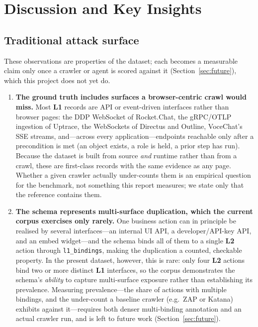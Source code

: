 \documentclass[11pt,a4paper]{article}
\newcommand{\cd}[1]{\lstinline[basicstyle=\ttfamily\small]|#1|}
\renewcommand{\L}[1]{\textbf{L#1}}
\begin{document}
\section{Discussion and Key Insights}\label{sec:disc}

\subsection{Traditional attack surface}
These observations are properties of the dataset; each becomes a measurable claim only once
a crawler or agent is scored against it (Section~\ref{sec:future}), which this project does
not yet do.
\begin{enumerate}[leftmargin=1.6em,itemsep=3pt]
\item \textbf{The ground truth includes surfaces a browser-centric crawl would miss.}
      Most \L1 records are API or event-driven interfaces rather than browser pages: the
      DDP WebSocket of Rocket.Chat, the gRPC/OTLP ingestion of Uptrace, the WebSockets of
      Directus and Outline, VoceChat's SSE streams, and---across every application---endpoints
      reachable only after a precondition is met (an object exists, a role is held, a prior
      step has run). Because the dataset is built from source \emph{and} runtime rather than
      from a crawl, these are first-class records with the same evidence as any page. Whether
      a given crawler actually under-counts them is an empirical question for the benchmark,
      not something this report measures; we state only that the reference contains them.
\item \textbf{The schema represents multi-surface duplication, which the current corpus
      exercises only rarely.} One business action can in principle be realised by several
      interfaces---an internal UI API, a developer/API-key API, and an embed widget---and
      the schema binds all of them to a single \L2 action through \cd{l1_bindings}, making
      the duplication a counted, checkable property. In the present dataset, however, this
      is rare: only four \L2 actions bind two or more distinct \L1 interfaces, so the
      corpus demonstrates the schema's \emph{ability} to capture multi-surface exposure
      rather than establishing its prevalence. Measuring prevalence---the share of actions
      with multiple bindings, and the under-count a baseline crawler (e.g.\ ZAP or Katana)
      exhibits against it---requires both denser multi-binding annotation and an actual
      crawler run, and is left to future work (Section~\ref{sec:future}).
\end{enumerate}
\end{document}
